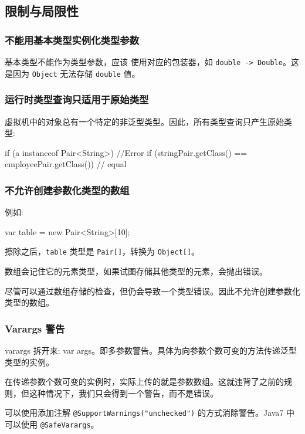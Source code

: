 \subsection{限制与局限性}

\subsubsection*{不能用基本类型实例化类型参数}

基本类型不能作为类型参数，应该 使用对应的包装器，如 \texttt{double -> Double}。这是因为 \texttt{Object} 无法存储 \texttt{double} 值。

\subsubsection*{运行时类型查询只适用于原始类型}

虚拟机中的对象总有一个特定的非泛型类型。因此，所有类型查询只产生原始类型:

\begin{Java}
if (a instanceof Pair<String>) //Error
if (stringPair.getClass() == employeePair.getClass()) // equal
\end{Java}

\subsubsection*{不允许创建参数化类型的数组}

例如:
\begin{Java}
var table = new Pair<String>[10];
\end{Java}

擦除之后，\texttt{table} 类型是 \texttt{Pair[]}，转换为 \texttt{Object[]}。

数组会记住它的元素类型，如果试图存储其他类型的元素，会抛出错误。

尽管可以通过数组存储的检查，但仍会导致一个类型错误。因此不允许创建参数化类型的数组。

\subsubsection*{Varargs 警告}

varargs 拆开来: var args。即多参数警告。具体为向参数个数可变的方法传递泛型类型的实例。

在传递参数个数可变的实例时，实际上传的就是参数数组。这就违背了之前的规则，但这种情况下，我们只会得到一个警告，而不是错误。

可以使用添加注解 \texttt{@SupportWarnings("unchecked")} 的方式消除警告。Java7 中可以使用 \texttt{@SafeVarargs}。

